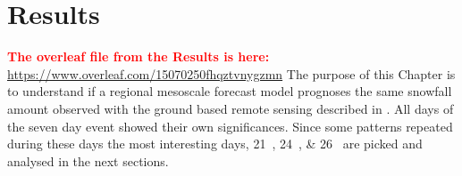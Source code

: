 \chapter{Results} \label{ch:Res}
 \textcolor{red}{\textbf{The overleaf file from the Results is here:} \\ \url{https://www.overleaf.com/15070250fhqztvnygzmn}} 
%
The purpose of this Chapter is to understand if a regional mesoscale forecast model prognoses the same snowfall amount observed with the ground based remote sensing described in . All days of the seven day event showed their own significances. Since some patterns repeated during these days the most interesting days, \SIlist{21;24;26}{\dec} are picked and analysed in the next sections.
%
